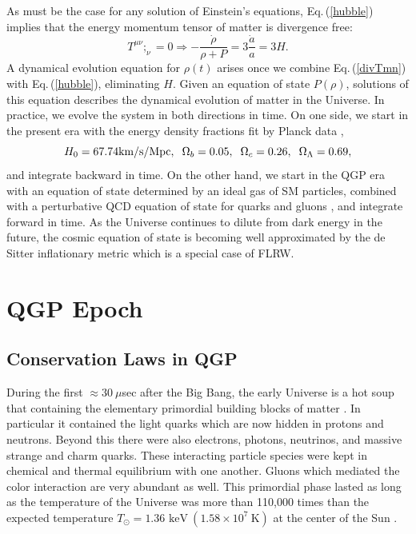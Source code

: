 \documentclass[universe,article,submit,moreauthors,pdftex,a4paper]{Definitions/mdpi}
\newcommand{\keV}{\text{ keV}}
\newcommand{\beqn}{\begin{equation}}
\newcommand{\eeqn}{\end{equation}}
\newcommand{\req}[1]{Eq.\,(\ref{#1})}
\begin{document}
As must be the case for any solution of Einstein's equations,   \req{hubble} implies that the energy momentum tensor of matter is divergence free:
\beqn\label{divTmn}
T^{\mu\nu};_\nu =0 \Rightarrow -\frac{\dot\rho}{\rho+P}=3\frac{\dot a}{a}=3H.
\eeqn
A dynamical evolution equation for $\rho(t)$ arises once we combine \req{divTmn} with \req{hubble},  eliminating $H$.   Given an equation of state $P(\rho)$, solutions of this equation describes the dynamical evolution of matter in the Universe. In practice, we evolve the system in both directions in time.  On one side, we start in the present era with the energy density fractions fit by Planck data \cite{Planck:2013pxb},
\begin{equation}\label{Planck_params}
H_0=67.74\text{km/s/Mpc},\hspace{2mm} \Omega_b=0.05,\hspace{2mm} \Omega_c=0.26, \hspace{2mm}\Omega_\Lambda=0.69,
\end{equation}
 and integrate backward in time. On the other hand, we start in the QGP era with an equation of state determined by an ideal gas of SM particles, combined with a perturbative QCD equation of state for quarks and gluons \cite{Borsanyi:2013bia}, and integrate forward in time. As the Universe continues to dilute from dark energy in the future, the cosmic equation of state is becoming well approximated by the de Sitter inflationary metric which is a special case of FLRW.



\section{QGP Epoch}\label{sec:QGP}
\subsection{Conservation Laws in QGP}\label{sec:Conservation}
\noindent During the first $\approx30\ \mu$sec after the Big Bang, the early Universe is a hot soup that containing the elementary primordial building blocks of matter \cite{Rafelski:2015cxa}. In particular it contained the light quarks which are now hidden in protons and neutrons. Beyond this there were also electrons, photons, neutrinos, and massive strange and charm quarks. These interacting particle species were kept in chemical and thermal equilibrium with one another. Gluons which mediated the color interaction are very abundant as well. This primordial phase lasted as long as the temperature of the Universe was more than 110,000 times than the expected temperature $T_{\odot}=1.36\keV\ (1.58\times10^{7}\ \mathrm{K})$ at the center of the Sun \cite{Castellani:1996cm}.
\end{document}
